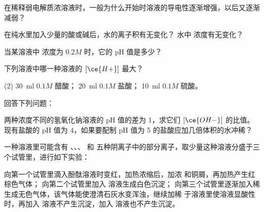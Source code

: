 \begin{Review}
\begin{question}
  \item 在稀释弱电解质浓溶液时，一般为什么开始时溶液的导电性逐渐增强，以后又逐渐减弱？
  \item 在纯水里加入少量的酸或碱后，水的离子积有无变化？ 水中  浓度有无变化？
  \item 当某溶液中  浓度为 $0.2M$ 时，它的 pH 值是多少？
  \item 下列溶液中哪一种溶液的 $[\ce{H+}]$ 最大？
  \begin{tasks}(2)
    \task \qty{30}{ml} $0.1M$ 醋酸；
    \task \qty{20}{ml} $0.1M$ 盐酸；
    \task \qty{10}{ml} $0.1M$ 硫酸。
  \end{tasks}
  \item 回答下列问题：
  \begin{tasks}[label=(\arabic*)]
    \task 两种浓度不同的氢氧化钠溶液的 pH 值的差为 1，求它们 $[\ce{OH-}]$ 的比值。
    \task 现有盐酸的 pH 值为 4，如果要配制 pH 值为 5 的盐酸应加几倍体积的水冲稀？
  \end{tasks}
  \item 一种溶液里可能含有 、、、 和  五种阴离子中的部分离子，取少量这种溶液分盛于三个试管里，进行如下实验：
  \begin{tasks}[label=(\arabic*)]
    \task 向第一个试管里滴入酚酞溶液时变红，加热浓缩后，加浓  和铜屑，再加热产生红棕色气体；
    \task 向第二个试管里加入  溶液生成白色沉淀；
    \task 向第三个试管里逐渐加入稀  生成无色气体，该气体能使澄清石灰水变浑浊，继续加稀  于溶液里使溶液显酸性时，再加入  溶液不产生沉淀，加入  溶液也不产生沉淀。


\end{tasks}
\end{question}
\end{Review}
